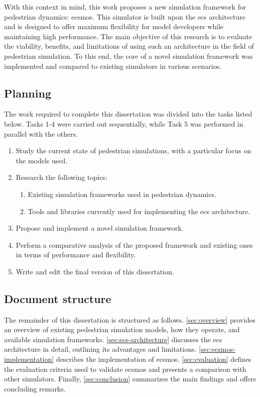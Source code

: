 \documentclass[twoside, 11pt]{article}
\begin{document}
With this context in mind, this work proposes a new simulation framework for pedestrian dynamics: \gls{ecsmos}. This simulator is built upon the \gls{ecs} architecture and is designed to offer maximum flexibility for model developers while maintaining high performance. The main objective of this research is to evaluate the viability, benefits, and limitations of using such an architecture in the field of pedestrian simulation. To this end, the core of a novel simulation framework was implemented and compared to existing simulators in various scenarios.

\subsection{Planning}

The work required to complete this dissertation was divided into the tasks listed below. Tasks 1-4 were carried out sequentially, while Task 5 was performed in parallel with the others.

\begin{enumerate}
  \item Study the current state of pedestrian simulations, with a particular focus on the models used.
  \item Research the following topics:
  \begin{enumerate}
    \item Existing simulation frameworks used in pedestrian dynamics.
    \item Tools and libraries currently used for implementing the \gls{ecs} architecture.
  \end{enumerate}
  \item Propose and implement a novel simulation framework.
  \item Perform a comparative analysis of the proposed framework and existing ones in terms of performance and flexibility.
  \item Write and edit the final version of this dissertation.
\end{enumerate}

\subsection{Document structure}

The remainder of this dissertation is structured as follows. \autoref{sec:overview} provides an overview of existing pedestrian simulation models, how they operate, and available simulation frameworks. \autoref{sec:ecs-architecture} discusses the \gls{ecs} architecture in detail, outlining its advantages and limitations. \autoref{sec:ecsmos-implementation} describes the implementation of \gls{ecsmos}. \autoref{sec:evaluation} defines the evaluation criteria used to validate \gls{ecsmos} and presents a comparison with other simulators. Finally, \autoref{sec:conclusion} summarizes the main findings and offers concluding remarks.
\end{document}
